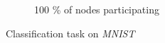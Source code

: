 \documentclass[10pt]{article}
\begin{document}
\begin{figure}[H]
\begin{subfigure}{.33\textwidth}
        \caption{100 \% of nodes participating}
    \end{subfigure}
    \caption{Classification task on \textit{MNIST}}
\label{fig:stoch-sum-mnist}
\end{figure}



\end{document}
